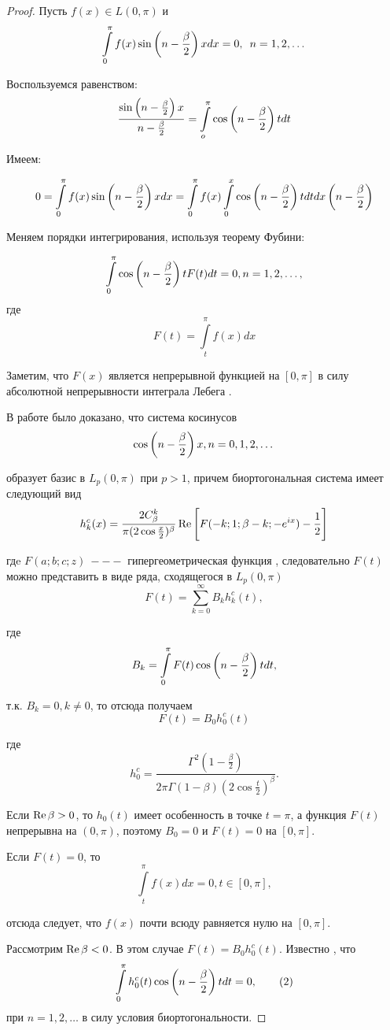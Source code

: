 ﻿\documentclass[oneside, final, 14pt]{extreport}
\begin{document}
	
	\begin{proof}
		Пусть $f(x) \in L(0, \pi)$ и $$\int\limits_0^{\pi}f(x)\sin\left(n - \frac{\beta}{2}\right)xdx = 0, \enspace n = 1, 2, \dots$$
		
		Воспользуемся равенством:
		$$
			\frac{\sin\left(n - \frac{\beta}{2}\right)x}{n - \frac{\beta}{2}} = \int\limits_o^\pi\cos\left(n - \frac{\beta}{2}\right)tdt
		$$
		
		Имеем:
		
		$$
			 0 = \int\limits_0^\pi f(x)\sin\left(n - \frac{\beta}{2}\right)xdx = \int\limits_0^\pi f(x) \int\limits_0^x\cos\left(n - \frac{\beta}{2}\right)tdtdx\left(n - \frac{\beta}{2}\right)
		$$
		
		Меняем порядки интегрирования, используя теорему Фубини:
	
		$$
			\int\limits_0^\pi\cos\left(n - \frac{\beta}{2}\right)tF(t)dt = 0, n = 1, 2, \dots,
		$$
		где
		$$
			F(t) = \int\limits_t^\pi f(x) dx
		$$
		
		Заметим, что $F(x)$ является непрерывной функцией на $[0, \pi]$ в силу абсолютной непрерывности 
		интеграла Лебега \cite{kolmogorov}.
		
		В работе \cite{moiseev-dan} было доказано, что система косинусов
		$$
			\cos\left(n - \frac{\beta}{2}\right)x, n = 0, 1, 2, \dots
		$$
		
		образует базис в $L_p(0, \pi)$ при $p > 1$, причем биортогональная система имеет следующий вид
		$$
			h^c_k(x) = \frac{2C^k_\beta}{\pi(2\cos\frac{x}{2})^\beta}\operatorname{Re}\Bigg[F(-k; 1; \beta - k; -e^{ix}) - \frac{1}{2}\Bigg]
		$$
		
		гдe $F(a; b; c; z) ~--- $ гипергеометрическая функция \cite{bateman}, следовательно $F(t)$ можно представить
		в виде ряда, сходящегося в $L_p(0, \pi)$
		$$
			F(t) = \sum\limits^\infty_{k = 0}B_k h^c_k(t), 
		$$
		
		где 
		$$
			B_k = \int\limits_0^\pi F(t) \cos\left(n - \frac{\beta}{2}\right)tdt,
		$$
		
		т.к. $B_k = 0, k \neq 0$, то отсюда получаем 
		$$
			F(t) = B_0 h^c_0(t)
		$$
		
		где 
		$$
			h^c_0 = \frac{\Gamma^2(1 - \frac{\beta}{2})}{2\pi \Gamma(1- \beta)(2\cos\frac{t}{2})^\beta}.
		$$
		
		Если $\operatorname{Re}\beta > 0$, то $h_0(t)$ имеет особенность в точке $t = \pi$, а функция $F(t)$ непрерывна на $(0, \pi)$,
		поэтому $B_0 = 0$ и $F(t) = 0$ на $[0, \pi]$.
		
		Если $F(t) = 0$, то 
		$$
			\int\limits_t^\pi f(x)dx = 0, t \in [0, \pi],
		$$
		
		отсюда следует, что $f(x)$ почти всюду равняется нулю на $[0, \pi]$.
		
		Рассмотрим $\operatorname{Re}\beta < 0$. В этом случае $F(t) = B_0h^c_0(t)$. Известно \cite{moiseev-dan}, что
		\begin{equation}
			\int\limits_0^\pi h^c_0(t)\cos\left(n - \frac{\beta}{2}\right)tdt = 0, \tag{2} \label{eq:2}
		\end{equation}
		при $n = 1, 2, \ldots$ в силу условия биортогональности.
		

\end{proof}
\end{document}
